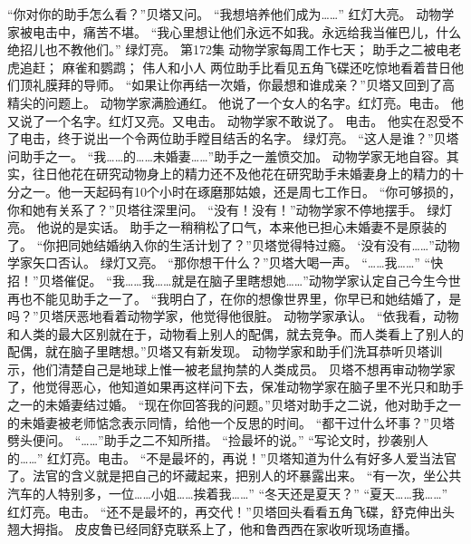 \documentclass[a4paper,12pt,UTF8,twoside]{ctexbook}
\begin{document}
        “你对你的助手怎么看？”贝塔又问。 
        “我想培养他们成为……” 
        红灯大亮。 
        动物学家被电击中，痛苦不堪。 
        “我心里想让他们永远不如我。永远给我当催巴儿，什么绝招儿也不教他们。” 
        绿灯亮。   第172集 
        动物学家每周工作七天； 
        助手之二被电老虎追赶； 
        麻雀和鹦鹉； 
        伟人和小人   
        两位助手比看见五角飞碟还吃惊地看着昔日他们顶礼膜拜的导师。 
        “如果让你再结一次婚，你最想和谁成亲？”贝塔又回到了高精尖的问题上。 
        动物学家满脸通红。 
        他说了一个女人的名字。红灯亮。电击。 
        他又说了一个名字。红灯又亮。又电击。 
        动物学家不敢说了。 
        电击。 
        他实在忍受不了电击，终于说出一个令两位助手瞠目结舌的名字。 
        绿灯亮。 
        “这人是谁？”贝塔问助手之一。 
        “我……的……未婚妻……”助手之一羞愤交加。 
        动物学家无地自容。其实，往日他花在研究动物身上的精力还不及他花在研究助手未婚妻身上的精力的十分之一。他一天起码有10个小时在琢磨那姑娘，还是周七工作日。 
        “你可够损的，你和她有关系了？”贝塔往深里问。 
        “没有！没有！”动物学家不停地摆手。 
        绿灯亮。 
        他说的是实话。 
        助手之一稍稍松了口气，本来他已担心未婚妻不是原装的了。 
        “你把同她结婚纳入你的生活计划了？”贝塔觉得特过瘾。 
        ‘没有没有……”动物学家矢口否认。 
        绿灯又亮。 
        “那你想干什么？”贝塔大喝一声。 
        “……我……” 
        “快招！”贝塔催促。 
        “我……我……就是在脑子里瞎想她……”动物学家认定自己今生今世再也不能见助手之一了。 
        “我明白了，在你的想像世界里，你早已和她结婚了，是吗？”贝塔厌恶地看着动物学家，他觉得他很脏。 
        动物学家承认。 
        “依我看，动物和人类的最大区别就在于，动物看上别人的配偶，就去竞争。而人类看上了别人的配偶，就在脑子里瞎想。”贝塔又有新发现。 
        动物学家和助手们洗耳恭听贝塔训示，他们清楚自己是地球上惟一被老鼠拘禁的人类成员。 
        贝塔不想再审动物学家了，他觉得恶心，他知道如果再这样问下去，保准动物学家在脑子里不光只和助手之一的未婚妻结过婚。 
        “现在你回答我的问题。”贝塔对助手之二说，他对助手之一的未婚妻被老师惦念表示同情，给他一个反思的时间。 
        “都干过什么坏事？”贝塔劈头便问。 
        “……”助手之二不知所措。 
        “捡最坏的说。” 
        “写论文时，抄袭别人的……” 
        红灯亮。电击。 
        “不是最坏的，再说！”贝塔知道为什么有好多人爱当法官了。法官的含义就是把自己的坏藏起来，把别人的坏暴露出来。 
        “有一次，坐公共汽车的人特别多，一位……小姐……挨着我……” 
        “冬天还是夏天？” 
        “夏天……我……” 
        红灯亮。电击。 
        “还不是最坏的，再交代！”贝塔回头看看五角飞碟，舒克伸出头翘大拇指。 
        皮皮鲁已经同舒克联系上了，他和鲁西西在家收听现场直播。 
\end{document}

